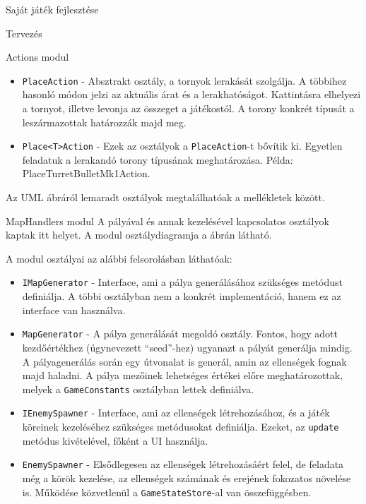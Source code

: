 \begin{MyChapter}{Saját játék fejlesztése}
\begin{MySection}{Tervezés}
\begin{MySubSection}{Actions modul}
\begin{itemize}
				\item \texttt{PlaceAction} - Absztrakt osztály, a tornyok lerakását szolgálja. A többihez hasonló módon jelzi az aktuális árat és a lerakhatóságot. Kattintásra elhelyezi a tornyot, illetve levonja az összeget a játékostól. A torony konkrét típusát a leszármazottak határozzák majd meg.
				
				\item \texttt{Place<T>Action} - Ezek az osztályok a \texttt{PlaceAction}-t bővítik ki. Egyetlen feladatuk a lerakandó torony típusának meghatározása. Példa: PlaceTurretBulletMk1Action.
			\end{itemize}
			
			Az UML ábráról lemaradt osztályok megtalálhatóak a mellékletek között.
		\end{MySubSection}
	
		\begin{MySubSection}{MapHandlers modul}
			A pályával és annak kezelésével kapcsolatos osztályok kaptak itt helyet.
			A modul osztálydiagramja a  ábrán látható.
			
			A modul osztályai az alábbi felsorolásban láthatóak:
			\begin{itemize}
				\item \texttt{IMapGenerator} - Interface, ami a pálya generálásához szükséges metódust definiálja. A többi osztályban nem a konkrét implementáció, hanem ez az interface van használva.
				
				\item \texttt{MapGenerator} - A pálya generálását megoldó osztály. Fontos, hogy adott kezdőértékhez (úgynevezett ``seed''-hez) ugyanazt a pályát generálja mindig. A pályagenerálás során egy útvonalat is generál, amin az ellenségek fognak majd haladni. A pálya mezőinek lehetséges értékei előre meghatározottak, melyek a \texttt{GameConstants} osztályban lettek definiálva.
				
				\item \texttt{IEnemySpawner} - Interface, ami az ellenségek létrehozásához, és a játék köreinek kezeléséhez szükséges metódusokat definiálja. Ezeket, az \texttt{update} metódus kivételével, főként a UI használja.
				
				\item \texttt{EnemySpawner} - Elsődlegesen az ellenségek létrehozásáért felel, de feladata még a körök kezelése, az ellenségek számának és erejének fokozatos növelése is. Működése közvetlenül a \texttt{GameStateStore}-al van összefüggésben.
				

\end{itemize}
\end{MySubSection}
\end{MySection}
\end{MyChapter}
